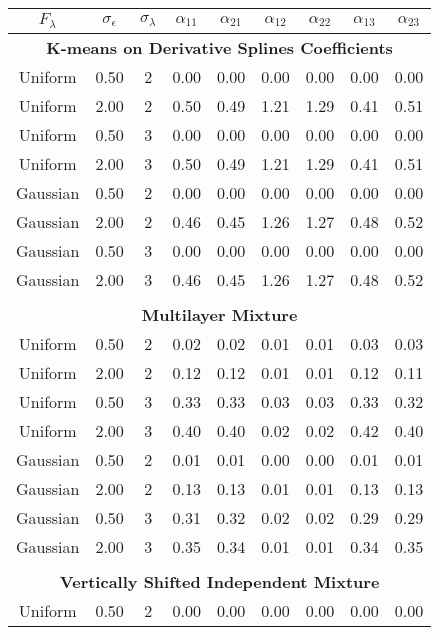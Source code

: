 \begin{table}[ht]
\begin{center}
\begin{tabular}{ccc|cccccc}
  \thickhline $F_{\lambda}$&$\sigma_{\epsilon}$&$\sigma_{\lambda}$&$\alpha_{11}$&$\alpha_{21}$&$\alpha_{12}$&$\alpha_{22}$&$\alpha_{13}$&$\alpha_{23}$\\  \hline\multicolumn{9}{c}{\textbf{K-means on Derivative Splines Coefficients}}\\ Uniform & 0.50 &   2 & 0.00 & 0.00 & 0.00 & 0.00 & 0.00 & 0.00 \\ 
  Uniform & 2.00 &   2 & 0.50 & 0.49 & 1.21 & 1.29 & 0.41 & 0.51 \\ 
  Uniform & 0.50 &   3 & 0.00 & 0.00 & 0.00 & 0.00 & 0.00 & 0.00 \\ 
  Uniform & 2.00 &   3 & 0.50 & 0.49 & 1.21 & 1.29 & 0.41 & 0.51 \\ 
  Gaussian & 0.50 &   2 & 0.00 & 0.00 & 0.00 & 0.00 & 0.00 & 0.00 \\ 
  Gaussian & 2.00 &   2 & 0.46 & 0.45 & 1.26 & 1.27 & 0.48 & 0.52 \\ 
  Gaussian & 0.50 &   3 & 0.00 & 0.00 & 0.00 & 0.00 & 0.00 & 0.00 \\ 
  Gaussian & 2.00 &   3 & 0.46 & 0.45 & 1.26 & 1.27 & 0.48 & 0.52 \\ 
   \\ \multicolumn{9}{c}{\textbf{Multilayer Mixture}}\\Uniform & 0.50 &   2 & 0.02 & 0.02 & 0.01 & 0.01 & 0.03 & 0.03 \\ 
  Uniform & 2.00 &   2 & 0.12 & 0.12 & 0.01 & 0.01 & 0.12 & 0.11 \\ 
  Uniform & 0.50 &   3 & 0.33 & 0.33 & 0.03 & 0.03 & 0.33 & 0.32 \\ 
  Uniform & 2.00 &   3 & 0.40 & 0.40 & 0.02 & 0.02 & 0.42 & 0.40 \\ 
  Gaussian & 0.50 &   2 & 0.01 & 0.01 & 0.00 & 0.00 & 0.01 & 0.01 \\ 
  Gaussian & 2.00 &   2 & 0.13 & 0.13 & 0.01 & 0.01 & 0.13 & 0.13 \\ 
  Gaussian & 0.50 &   3 & 0.31 & 0.32 & 0.02 & 0.02 & 0.29 & 0.29 \\ 
  Gaussian & 2.00 &   3 & 0.35 & 0.34 & 0.01 & 0.01 & 0.34 & 0.35 \\ 
   \\ \multicolumn{9}{c}{\textbf{Vertically Shifted Independent Mixture}}\\Uniform & 0.50 &   2 & 0.00 & 0.00 & 0.00 & 0.00 & 0.00 & 0.00 \\ 

\end{tabular}
\end{center}
\end{table}
